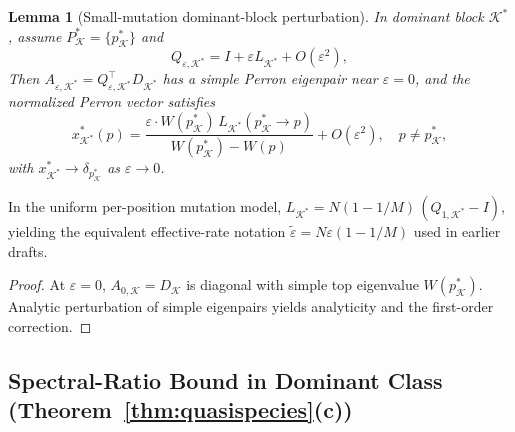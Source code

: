 \documentclass[12pt]{article}
\newtheorem{lemma}[theorem]{Lemma}
\begin{document}
\begin{lemma}[Small-mutation dominant-block perturbation]\label{lem:small-mutation}
In dominant block $\mathcal{K}^*$, assume $P^*_\mathcal{K} = \{p^*_\mathcal{K}\}$ and
\[
Q_{\varepsilon,\mathcal{K}^*} = I + \varepsilon L_{\mathcal{K}^*} + O(\varepsilon^2),
\]
Then $A_{\varepsilon,\mathcal{K}^*} = Q_{\varepsilon,\mathcal{K}^*}^\top D_{\mathcal{K}^*}$ has a simple Perron eigenpair near $\varepsilon = 0$, and the normalized Perron vector satisfies
\begin{equation}
x^*_{\mathcal{K}^*}(p) = \frac{\varepsilon \cdot W(p^*_\mathcal{K})\, L_{\mathcal{K}^*}(p^*_\mathcal{K} \to p)}{W(p^*_\mathcal{K}) - W(p)} + O(\varepsilon^2), \quad p \ne p^*_\mathcal{K},
\end{equation}
with $x^*_{\mathcal{K}^*} \to \delta_{p^*_\mathcal{K}}$ as $\varepsilon \to 0$.
\end{lemma}

In the uniform per-position mutation model, $L_{\mathcal{K}^*} = N(1 - 1/M)\,(Q_{1,\mathcal{K}^*} - I)$, yielding the equivalent effective-rate notation $\tilde{\varepsilon} = N\varepsilon(1 - 1/M)$ used in earlier drafts.

\begin{proof}
At $\varepsilon = 0$, $A_{0,\mathcal{K}} = D_\mathcal{K}$ is diagonal with simple top eigenvalue $W(p^*_\mathcal{K})$. Analytic perturbation of simple eigenpairs \citep{kato_1995,greenbaum_etal_2020} yields analyticity and the first-order correction.
\end{proof}

\subsection{Spectral-Ratio Bound in Dominant Class (Theorem~\ref*{thm:quasispecies}(c))}\label{app:spectral-ratio}
\end{document}
